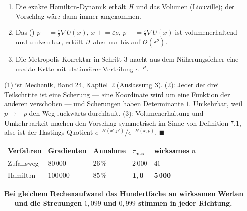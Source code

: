 \begin{merksatz}
\begin{enumerate}
\item Die exakte Hamilton-Dynamik erhält $H$ und das Volumen (Liouville); der Vorschlag wäre dann immer angenommen.
\item Das  () $p \mathrel{-}= \tfrac\varepsilon2\nabla U(x)$, $x \mathrel{+}= \varepsilon p$, $p \mathrel{-}= \tfrac\varepsilon2\nabla U(x)$ ist volumenerhaltend und umkehrbar, erhält $H$ aber nur bis auf $O(\varepsilon^2)$.
\item Die Metropolis-Korrektur in Schritt $3$ macht aus dem Näherungsfehler eine exakte Kette mit stationärer Verteilung $e^{-H}$.
\end{enumerate}

(1) ist Mechanik, Band 24, Kapitel~2 (Auslassung 3). (2): Jeder der drei Teilschritte ist eine Scherung --- eine Koordinate wird um eine Funktion der anderen verschoben --- und Scherungen haben Determinante $1$. Umkehrbar, weil $p\to-p$ den Weg rückwärts durchläuft. (3): Volumenerhaltung und Umkehrbarkeit machen den Vorschlag symmetrisch im Sinne von Definition 7.1, also ist der Hastings-Quotient $e^{-H(x',p')}/e^{-H(x,p)}$. $\blacksquare$

\begin{center}
{\small
\renewcommand{\arraystretch}{1.48}
\begin{tabular}{@{}P{2.4cm}P{2.0cm}P{1.6cm}P{1.6cm}P{2.2cm}@{}}
\toprule
\textbf{Verfahren} & \textbf{Gradienten} & \textbf{Annahme} & $\tau_{\max}$ & \textbf{wirksames $n$}\\
\midrule
Zufallsweg & $80\,000$ & $26\,\%$ & $2\,000$ & $40$\\
Hamilton & $100\,000$ & $85\,\%$ & $\mathbf{1{,}0}$ & $\mathbf{5\,000}$\\
\bottomrule
\end{tabular}}
\end{center}

\begin{center}
\begin{minipage}{0.9\textwidth}
\textbf{Bei gleichem Rechenaufwand das Hundertfache an wirksamen Werten --- und die Streuungen $0{,}099$ und $0{,}999$ stimmen in jeder Richtung.}
\end{minipage}
\end{center}


\end{merksatz}
